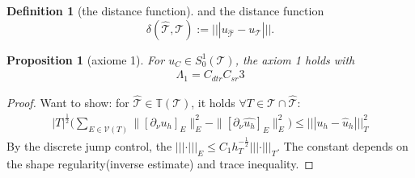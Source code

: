\documentclass[a4paper,12pt,oneside,fleqn]{book}
\newtheorem{proposition}[theorem]{Proposition}
\theoremstyle{definition}
\newtheorem{definition}{Definition}[section]
\theoremstyle{remark}
\begin{document}
\begin{definition}[the distance function]
	and the distance function
\begin{equation}
	\delta(\hat{\mathcal{T}}, \mathcal{T}):= |||  u_{\hat{\mathcal{T}}} -  u_{\mathcal{T}}|||.
\end{equation}
\end{definition}

\begin{proposition}[axiome 1]
	For $u_C \in S_0^1(\mathcal{T})$, the axiom 1 holds with
	\begin{align*}
		\Lambda_1 = C_{dtr} C_{sr} 3
	\end{align*}
\end{proposition}
\begin{proof}
Want to show: for $\hat{\mathcal{T}} \in \mathbb{T}(\mathcal{T})$, it holds $\forall T \in \mathcal{T} \cap \hat{\mathcal{T}}$:
\begin{align*}
  |T|^{\frac{1}{2}} \bigg( \sum_{E \in\mathcal{V}(T)} \| [\partial_\nu u_h]_E \|_E^2 - \| [\partial_\nu \hat{u_h}]_E \|_E^2\bigg) \le |||u_h - \hat{u}_h|||^2_T
\end{align*}
By the discrete jump control, the $|||\cdot|||_E \le C_1 h_T^{-\frac{1}{2}} |||\cdot |||_T.$ The constant depends on the shape regularity(inverse estimate) and trace inequality. 
\end{proof}
\end{document}
